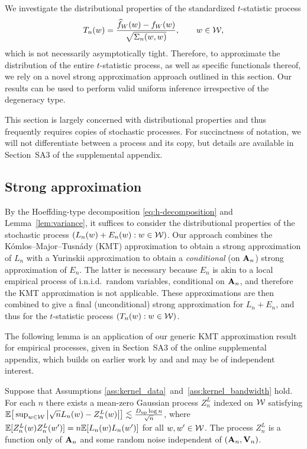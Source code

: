 We investigate the distributional properties of the
standardized $t$-statistic process
%
\[ T_n(w) = \frac{\widehat{f}_W(w) - f_W(w)}{\sqrt{\Sigma_n(w,w)}}
  , \qquad w\in\mathcal{W},\]
%
which is not necessarily asymptotically tight.
Therefore, to approximate the distribution of the entire $t$-statistic process,
as well as specific functionals thereof, we rely on a novel strong approximation
approach outlined in this section.
Our results can be used to perform valid uniform inference irrespective of the
degeneracy type.

This section is largely concerned with distributional properties and thus
frequently requires copies of stochastic processes.
For succinctness of notation, we will not differentiate between a process
and its copy, but details are available in
Section~SA3 of the supplemental appendix.

\subsection{Strong approximation}

By the Hoeffding-type decomposition
\eqref{eq:h-decomposition} and Lemma~\ref{lem:variance},
it suffices to consider the distributional properties
of the stochastic process $(L_n(w)+E_n(w):w\in\mathcal{W})$.
Our approach combines the K\'omlos--Major--Tusn\'ady (KMT) approximation
\citep{komlos1975approximation} to obtain a strong approximation of
$L_n$ with a Yurinskii approximation
\citep{yurinskii1978error} to obtain a
\emph{conditional} (on $\mathbf{A}_n$) strong approximation of
$E_n$.
The latter is necessary because
$E_n$ is akin to a local empirical process of i.n.i.d.\
random variables, conditional on $\mathbf{A}_n$,
and therefore the KMT approximation is not applicable.
These approximations are then combined to give a final
(unconditional) strong approximation for $L_n+E_n$,
and thus for the $t$-statistic process
$(T_n(w):w\in\mathcal{W})$.

The following lemma is an application of our generic
KMT approximation result for empirical processes,
given in Section~SA3 of
the online supplemental appendix,
which builds on earlier work by \citet{gine2004kernel}
and \citet{gine2010confidence} and may be of independent interest.

\begin{lemma}
  \label{lem:strong_approx_Ln}
  Suppose that Assumptions
  \ref{ass:kernel_data}~and~\ref{ass:kernel_bandwidth} hold.
  For each $n$ there exists
  a mean-zero Gaussian process
  $Z^L_n$ indexed on $\mathcal{W}$ satisfying
  $\mathbb{E}\big[ \sup_{w \in \mathcal{W}} \big| \sqrt{n} L_n(w) -  Z_n^L(w) \big| \big]
  \lesssim \frac{D_{\textup{up}} \log n}{\sqrt{n}}$,
  where $\mathbb{E}[Z_n^L(w)Z_n^L(w')] =  n\mathbb{E}[L_n(w)L_n(w')]$ for all $w, w' \in \mathcal{W}$.
  The process $Z_n^L$
  is a function only of $\mathbf{A}_n$ and some random noise
  independent of $(\mathbf{A}_n, \mathbf{V}_n)$.
\end{lemma}

